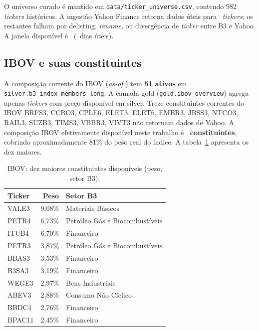\documentclass[12pt,a4paper,oneside]{article}
\begin{document}
O universo curado é mantido em \texttt{data/ticker\_universe.csv},
contendo 982 \textit{tickers} históricos. A ingestão Yahoo Finance
retorna dados úteis para \UniverseSize\ \textit{tickers}; os restantes
falham por delisting, \textit{rename}, ou divergência de \textit{ticker}
entre B3 e Yahoo. A janela disponível é \UniverseDates\
(\UniverseNTradingDays\ dias úteis).

\subsection{IBOV e suas constituintes}

A composição corrente do IBOV (\textit{as-of} \UniverseLastDate) tem
\textbf{51 ativos} em \texttt{silver.b3\_index\_members\_long}.
A camada gold (\texttt{gold.ibov\_overview}) agrega apenas
\textit{tickers} com preço disponível em silver. Treze constituintes
correntes do IBOV \textemdash{} BRFS3, CCRO3, CPLE6, ELET3, ELET6,
EMBR3, JBSS3, NTCO3, RAIL3, SUZB3, TIMS3, VBBR3, VIVT3 \textemdash{}
não retornam dados de Yahoo. A composição IBOV efetivamente disponível
neste trabalho é \textbf{\IBOVMembers\ constituintes}, cobrindo
aproximadamente 81\% do peso real do índice. A tabela~\ref{tab:ibov-top10}
apresenta os dez maiores.

\begin{table}[H]
\centering
\caption{IBOV: dez maiores constituintes disponíveis (peso, setor B3).}\label{tab:ibov-top10}
\small
\begin{tabular}{lrl}
\toprule
\textbf{Ticker} & \textbf{Peso} & \textbf{Setor B3} \\
\midrule
VALE3   & 9{,}08\% & Materiais Básicos \\
PETR4   & 6{,}73\% & Petróleo Gás e Biocombustíveis \\
ITUB4   & 6{,}70\% & Financeiro \\
PETR3   & 3{,}87\% & Petróleo Gás e Biocombustíveis \\
BBAS3   & 3{,}53\% & Financeiro \\
B3SA3   & 3{,}19\% & Financeiro \\
WEGE3   & 2{,}97\% & Bens Industriais \\
ABEV3   & 2{,}88\% & Consumo Não Cíclico \\
BBDC4   & 2{,}76\% & Financeiro \\
BPAC11  & 2{,}45\% & Financeiro \\
\bottomrule
\end{tabular}
\end{table}
\end{document}
